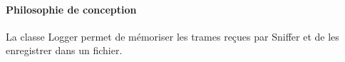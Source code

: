  \paragraph{Philosophie de conception}
La classe Logger permet de mémoriser les trames reçues par Sniffer et de les enregistrer dans un fichier.\\